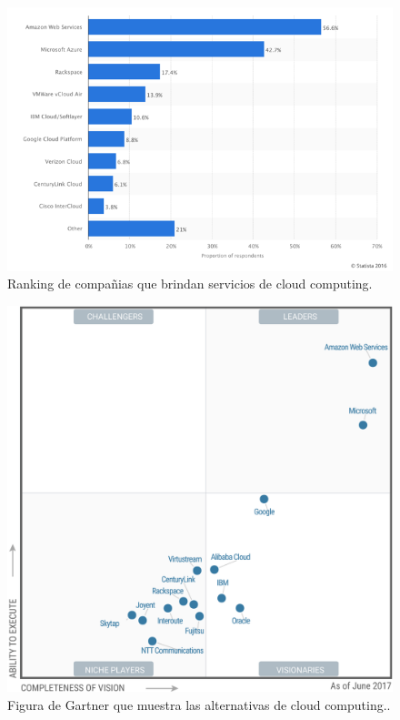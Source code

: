 \begin{figure}[H]
\centering
\includegraphics[width=125mm,scale=1]{Capitulos/PropuestadeSolucion/Imagenes/rank_cloud}
\caption{Ranking de compañias que brindan servicios de cloud computing.}
  \label{graph_cloud}
\end{figure}

\begin{figure}[H]
\centering
\includegraphics[width=125mm,scale=1]{Capitulos/PropuestadeSolucion/Imagenes/gartner_cloud}
\caption{Figura de Gartner que muestra las alternativas de cloud computing..}
  \label{gartner_cloud}
\end{figure}

